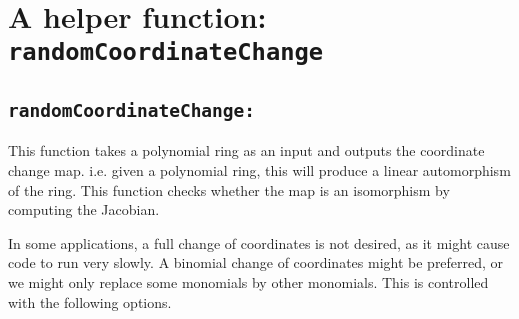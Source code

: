 \documentclass[11pt]{amsart}
\theoremstyle{definition}
\begin{document}
\section{A helper function: {\tt randomCoordinateChange}}{\label{helper}}


\subsection*{\tt randomCoordinateChange:} 

This function takes a polynomial ring as an input and outputs the coordinate change map.  
i.e. given a polynomial ring, this will produce a linear automorphism of the ring.  This function checks whether the map is an isomorphism by computing the Jacobian.

In some applications, a full change of coordinates is not desired, as it might cause code to run very slowly.  A binomial change of coordinates might be preferred, or we might only replace some monomials by other monomials.  
This is controlled with the following options.
\end{document}
